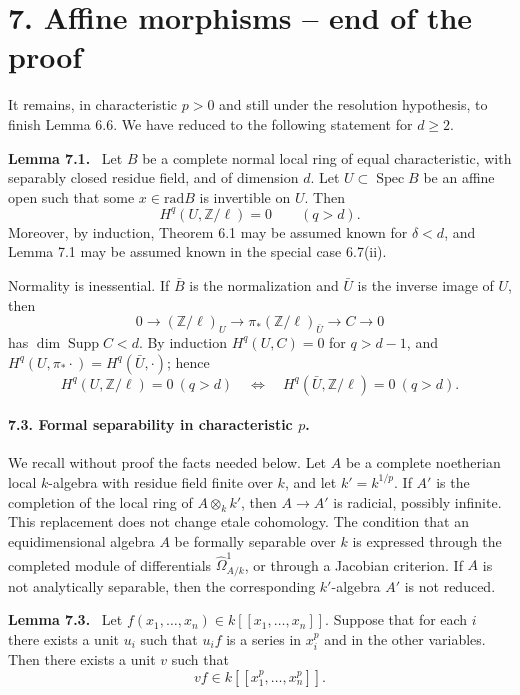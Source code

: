 \documentclass[12pt]{article}
\newcommand{\ZZ}{\mathbb Z}
\DeclareMathOperator{\Spec}{Spec}
\newcommand{\rad}{\mathrm{rad}}
\newenvironment{statement}[1]{\par\medskip\noindent\textbf{#1.}\ }{\par\medskip}
\begin{document}
\section*{7. Affine morphisms -- end of the proof}

It remains, in characteristic $p>0$ and still under the resolution hypothesis, to finish Lemma 6.6. We have reduced to the following statement for $d\ge2$.

\begin{statement}{Lemma 7.1}
Let $B$ be a complete normal local ring of equal characteristic, with separably closed residue field, and of dimension $d$. Let $U\subset\Spec B$ be an affine open such that some $x\in\rad B$ is invertible on $U$. Then
\[
   H^q(U,\ZZ/\ell)=0\qquad(q>d).
\]
Moreover, by induction, Theorem 6.1 may be assumed known for $\delta<d$, and Lemma 7.1 may be assumed known in the special case 6.7(ii).
\end{statement}

Normality is inessential. If $\bar B$ is the normalization and $\bar U$ is the inverse image of $U$, then
\[
0\to(\ZZ/\ell)_U\to \pi_*(\ZZ/\ell)_{\bar U}\to C\to0
\]
has $\dim\operatorname{Supp}C<d$. By induction $H^q(U,C)=0$ for $q>d-1$, and $H^q(U,\pi_*\cdot)=H^q(\bar U,\cdot)$; hence
\begin{equation}
H^q(U,\ZZ/\ell)=0\ (q>d)
\quad\Longleftrightarrow\quad
H^q(\bar U,\ZZ/\ell)=0\ (q>d). \tag{7.2}
\end{equation}

\paragraph{7.3. Formal separability in characteristic \texorpdfstring{$p$}{p}.}
We recall without proof the facts needed below. Let $A$ be a complete noetherian local $k$-algebra with residue field finite over $k$, and let $k'=k^{1/p}$. If $A'$ is the completion of the local ring of $A\otimes_kk'$, then $A\to A'$ is radicial, possibly infinite. This replacement does not change etale cohomology. The condition that an equidimensional algebra $A$ be formally separable over $k$ is expressed through the completed module of differentials $\widehat\Omega^1_{A/k}$, or through a Jacobian criterion. If $A$ is not analytically separable, then the corresponding $k'$-algebra $A'$ is not reduced.

\begin{statement}{Lemma 7.3}
Let $f(x_1,\ldots,x_n)\in k[[x_1,\ldots,x_n]]$. Suppose that for each $i$ there exists a unit $u_i$ such that $u_if$ is a series in $x_i^p$ and in the other variables. Then there exists a unit $v$ such that
\[
   vf\in k[[x_1^p,\ldots,x_n^p]].
\]
\end{statement}
\end{document}
